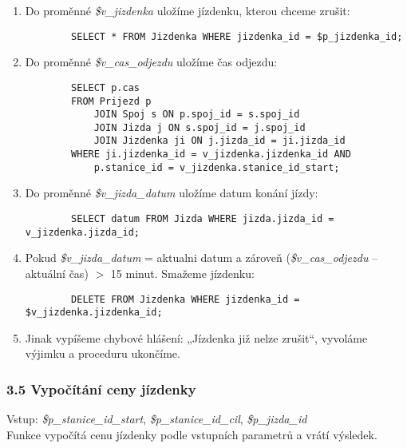 \documentclass[11pt]{article}
\begin{document}
\begin{enumerate}
    \item Do proměnné \textit{\$v\_jizdenka} uložíme jízdenku, kterou chceme zrušit:
    \begin{lstlisting}
        SELECT * FROM Jizdenka WHERE jizdenka_id = $p_jizdenka_id;
    \end{lstlisting}
    
    \item Do proměnné \textit{\$v\_cas\_odjezdu} uložíme čas odjezdu:
    \begin{lstlisting}
        SELECT p.cas
        FROM Prijezd p
            JOIN Spoj s ON p.spoj_id = s.spoj_id
            JOIN Jizda j ON s.spoj_id = j.spoj_id
            JOIN Jizdenka ji ON j.jizda_id = ji.jizda_id
        WHERE ji.jizdenka_id = v_jizdenka.jizdenka_id AND
            p.stanice_id = v_jizdenka.stanice_id_start;
    \end{lstlisting}

    \item Do proměnné \textit{\$v\_jizda\_datum} uložíme datum konání jízdy:
    \begin{lstlisting}
        SELECT datum FROM Jizda WHERE jizda.jizda_id = v_jizdenka.jizda_id;
    \end{lstlisting}

    \item Pokud \textit{\$v\_jizda\_datum} = aktualni datum a zároveň (\textit{\$v\_cas\_odjezdu} – aktuální čas) $>$ 15 minut. Smažeme jízdenku:
    \begin{lstlisting}
        DELETE FROM Jizdenka WHERE jizdenka_id = $v_jizdenka.jizdenka_id;
    \end{lstlisting}

    \item Jinak vypíšeme chybové hlášení: „Jízdenka již nelze zrušit“, vyvoláme výjimku a proceduru ukončíme.
\end{enumerate}


\subsubsection*{3.5 Vypočítání ceny jízdenky}
Vstup: \textit{\$p\_stanice\_id\_start}, \textit{\$p\_stanice\_id\_cil}, \textit{\$p\_jizda\_id}\\
Funkce vypočítá cenu jízdenky podle vstupních parametrů a vrátí výsledek.
\end{document}
